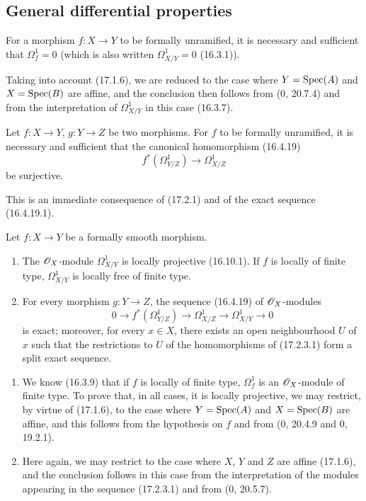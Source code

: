 \subsection{General differential properties}

\begin{proposition}[17.2.1]
\label{IV.17.2.1}
For a morphism $f:X\to Y$ to be formally unramified, it is necessary and sufficient that $\Omega_f^1=0$ (which is also written $\Omega_{X/Y}^1=0$ (16.3.1)).
\end{proposition}

Taking into account (17.1.6), we are reduced to the case where $Y=\operatorname{Spec}(A)$ and $X=\operatorname{Spec}(B)$ are affine, and the conclusion then follows from (0, 20.7.4) and from the interpretation of $\Omega_{X/Y}^1$ in this case (16.3.7).

\begin{corollary}[17.2.2]
\label{IV.17.2.2}
Let $f:X\to Y$, $g:Y\to Z$ be two morphisms. For $f$ to be formally unramified, it is necessary and sufficient that the canonical homomorphism (16.4.19)
\[
  f^*(\Omega_{Y/Z}^1)\longrightarrow\Omega_{X/Z}^1
\]
be surjective.
\end{corollary}

This is an immediate consequence of (17.2.1) and of the exact sequence (16.4.19.1).

\begin{proposition}[17.2.3]
\label{IV.17.2.3}
Let $f:X\to Y$ be a formally smooth morphism.
\begin{enumerate}
  \item[(i)] The $\mathscr{O}_X$-module $\Omega_{X/Y}^1$ is locally projective (16.10.1). If $f$ is locally of finite type, $\Omega_{X/Y}^1$ is locally free of finite type.
  \item[(ii)] For every morphism $g:Y\to Z$, the sequence (16.4.19) of $\mathscr{O}_X$-modules
  \[
  \label{IV.17.2.3.1}
    0\longrightarrow f^*(\Omega_{Y/Z}^1)\longrightarrow\Omega_{X/Z}^1\longrightarrow\Omega_{X/Y}^1\longrightarrow0
    \tag{17.2.3.1}
  \]
  is exact; moreover, for every $x\in X$, there exists an open neighbourhood $U$ of $x$ such that the restrictions to $U$ of the homomorphisms of (17.2.3.1) form a split exact sequence.
\end{enumerate}
\end{proposition}

\begin{enumerate}
  \item[(i)] We know (16.3.9) that if $f$ is locally of finite type, $\Omega_f^1$ is an $\mathscr{O}_X$-module of finite type. To prove that, in all cases, it is locally projective, we may restrict, by virtue of (17.1.6), to the case where $Y=\operatorname{Spec}(A)$ and $X=\operatorname{Spec}(B)$ are affine, and this follows from the hypothesis on $f$ and from (0, 20.4.9 and 0, 19.2.1).
  \item[(ii)] Here again, we may restrict to the case where $X$, $Y$ and $Z$ are affine (17.1.6), and the conclusion follows in this case from the interpretation of the modules appearing in the sequence (17.2.3.1) and from (0, 20.5.7).
\end{enumerate}

